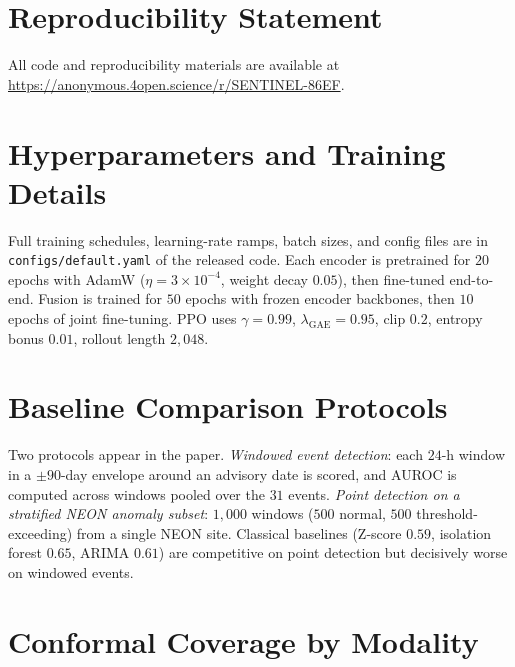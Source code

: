 \documentclass{article}
\begin{document}
\section*{Reproducibility Statement}

All code and reproducibility materials are available at \url{https://anonymous.4open.science/r/SENTINEL-86EF}.

\FloatBarrier




\clearpage
\appendix

\section{Hyperparameters and Training Details}
\label{app:hp}

Full training schedules, learning-rate ramps, batch sizes, and config files are in \texttt{configs/default.yaml} of the released code. Each encoder is pretrained for $20$ epochs with AdamW ($\eta\!=\!3{\times}10^{-4}$, weight decay $0.05$), then fine-tuned end-to-end. Fusion is trained for $50$ epochs with frozen encoder backbones, then $10$ epochs of joint fine-tuning. PPO uses $\gamma\!=\!0.99$, $\lambda_\text{GAE}\!=\!0.95$, clip $0.2$, entropy bonus $0.01$, rollout length $2{,}048$.

\section{Baseline Comparison Protocols}
\label{app:baselines}

Two protocols appear in the paper. \emph{Windowed event detection}: each $24$-h window in a $\pm 90$-day envelope around an advisory date is scored, and AUROC is computed across windows pooled over the $31$ events. \emph{Point detection on a stratified NEON anomaly subset}: $1{,}000$ windows ($500$ normal, $500$ threshold-exceeding) from a single NEON site. Classical baselines (Z-score $0.59$, isolation forest $0.65$, ARIMA $0.61$) are competitive on point detection but decisively worse on windowed events.

\section{Conformal Coverage by Modality}
\label{app:conformal}
\end{document}
